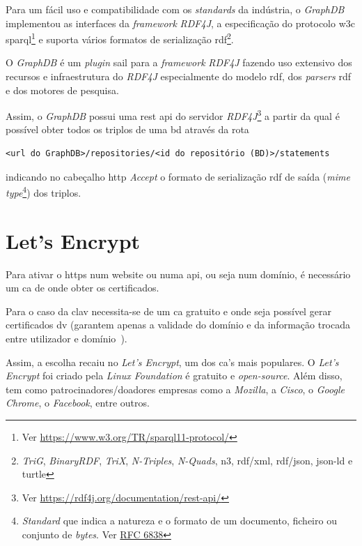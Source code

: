 Para um fácil uso e compatibilidade com os \textit{standards} da indústria, o \textit{GraphDB} implementou as interfaces da \textit{framework} \textit{RDF4J}, a especificação do protocolo \acrshort{w3c} \acrshort{sparql}\footnote{Ver \url{https://www.w3.org/TR/sparql11-protocol/}} e suporta vários formatos de serialização \acrshort{rdf}\footnote{\label{fnRDF}\textit{TriG}, \textit{BinaryRDF}, \textit{TriX}, \textit{N-Triples}, \textit{N-Quads}, \acrshort{n3}, \acrshort{rdf}/\acrshort{xml}, \acrshort{rdf}/\acrshort{json}, \acrshort{json-ld} e \acrshort{turtle}}.~\cite{graphdbAbout}

O \textit{GraphDB} é um \textit{plugin} \acrshort{sail} para a \textit{framework} \textit{RDF4J} fazendo uso extensivo dos recursos e infraestrutura do \textit{RDF4J} especialmente do modelo \acrshort{rdf}, dos \textit{parsers} \acrshort{rdf} e dos motores de pesquisa.~\cite{graphdbArch}

Assim, o \textit{GraphDB} possui uma \acrshort{rest} \acrshort{api} do servidor \textit{RDF4J}\footnote{Ver \url{https://rdf4j.org/documentation/rest-api/}} a partir da qual é possível obter todos os triplos de uma \acrshort{bd} através da rota
\begin{verbatim}
<url do GraphDB>/repositories/<id do repositório (BD)>/statements
\end{verbatim}
indicando no cabeçalho \acrshort{http} \textit{Accept} o formato de serialização \acrshort{rdf} de saída (\textit{\acrshort{mime} type}\footnote{\textit{Standard} que indica a natureza e o formato de um documento, ficheiro ou conjunto de \textit{bytes}. Ver \href{https://tools.ietf.org/html/rfc6838}{RFC 6838}}) dos triplos.

\section{Let's Encrypt}

Para ativar o \acrshort{https} num website ou numa \acrshort{api}, ou seja num domínio, é necessário um \acrfull{ca} de onde obter os certificados.

Para o caso da \acrshort{clav} necessita-se de um \acrshort{ca} gratuito e onde seja possível gerar certificados \acrfull{dv} (garantem apenas a validade do domínio e da informação trocada entre utilizador e domínio~\cite{certsTypes}).

Assim, a escolha recaiu no \textit{Let's Encrypt}, um dos \acrshort{ca}'s mais populares. O \textit{Let's Encrypt} foi criado pela \textit{Linux Foundation} é gratuito e \textit{open-source}. Além disso, tem como patrocinadores/doadores empresas como a \textit{Mozilla}, a \textit{Cisco}, o \textit{Google Chrome}, o \textit{Facebook}, entre outros. 

